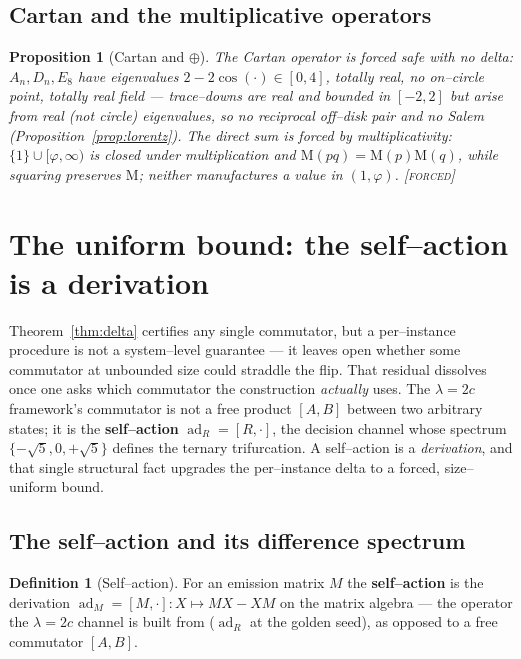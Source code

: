 \documentclass[11pt]{article}
\theoremstyle{plain}
\newtheorem{proposition}[theorem]{Proposition}
\theoremstyle{definition}
\newtheorem{definition}[theorem]{Definition}
\theoremstyle{remark}
\newcommand{\forced}{\textcolor{forcedc}{\textsc{[forced]}}}
\newcommand{\Mah}{\mathrm{M}}
\begin{document}
\subsection{Cartan and the multiplicative operators}\label{sec:cartanmult}

\begin{proposition}[Cartan and $\oplus$]\label{prop:cartan}
The Cartan operator is forced safe with no delta: $A_n,D_n,E_8$ have eigenvalues $2-2\cos(\cdot)\in[0,4]$, totally real, no on--circle point, totally real field --- trace--downs are real and bounded in $[-2,2]$ but arise from real (not circle) eigenvalues, so no reciprocal off--disk pair and no Salem (Proposition~\ref{prop:lorentz}). The direct sum is forced by multiplicativity: $\{1\}\cup[\varphi,\infty)$ is closed under multiplication and $\Mah(pq)=\Mah(p)\Mah(q)$, while squaring preserves $\Mah$; neither manufactures a value in $(1,\varphi)$. \forced
\end{proposition}

\section{The uniform bound: the self--action is a derivation}\label{sec:uniform}

Theorem~\ref{thm:delta} certifies any single commutator, but a per--instance procedure is not a system--level guarantee --- it leaves open whether some commutator at unbounded size could straddle the flip. That residual dissolves once one asks which commutator the construction \emph{actually} uses. The $\lambda=2c$ framework's commutator is not a free product $[A,B]$ between two arbitrary states; it is the \textbf{self--action} $\operatorname{ad}_R=[R,\cdot]$, the decision channel whose spectrum $\{-\sqrt5,0,+\sqrt5\}$ defines the ternary trifurcation. A self--action is a \emph{derivation}, and that single structural fact upgrades the per--instance delta to a forced, size--uniform bound.

\subsection{The self--action and its difference spectrum}\label{sec:selfaction}

\begin{definition}[Self--action]\label{def:selfaction}
For an emission matrix $M$ the \textbf{self--action} is the derivation $\operatorname{ad}_M=[M,\cdot]:X\mapsto MX-XM$ on the matrix algebra --- the operator the $\lambda=2c$ channel is built from ($\operatorname{ad}_R$ at the golden seed), as opposed to a free commutator $[A,B]$.
\end{definition}
\end{document}
